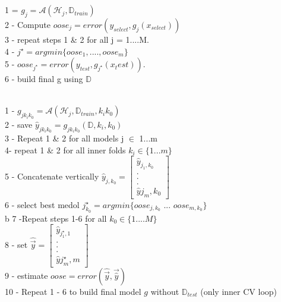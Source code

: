 \documentclass[12pt]{article}
\begin{document}
\begin{enumerate}
\\
\\
1 = $g_j = \mathcal{A} (\mathcal{H}_j, \mathbb{D}_{train})$\\ 2 - Compute $oose_j = error (y_{select}, g_j(x_{select}))$\\ 3 - repeat steps 1 \& 2 for all j = 1....M. \\ 4 - $j^\star = argmin \{oose_1,....,oose_m\}$\\ 5 - $oose_{j^\star} = error(y_{test}, g_{j^\star}(x_test))$.\\ 6 - build final g using $\mathbb{D}$

\\
1 - $g_{jk_ik_0} = \mathcal{A} (\mathcal{H}_j, \mathbb{D}_{train}, k_ik_0)$\\ 2 - save $\hat{y}_{jk_ik_0} = g_{jk_ik_0} (\mathbb{D},k_i,k_0)$ \\ 3 - Repeat 1 \& 2 for all models j $\in$ {1...m} \\4- repeat 1 \& 2 for all inner folds $k_i \in \{1...m\}$\\ 5 - Concatenate vertically $\hat{y}_{j,k_0} = \begin{bmatrix}
\hat{y}_{j_1,k_0} \\ . \\ . \\. \\ \hat{y}{j_m,k_0}
\end{bmatrix} 
$ \\6 - select best medol $j_{k_0}^\star = argmin \{oose_{j,k_0}$ ... $oose_{m,k_0}\}$ \\b 7 -Repeat steps 1-6 for all $k_0 \in \{1....M \}$\\8 -  set $\hat{\vec{y}} = \begin{bmatrix}
\hat{y}_{j_1^\star,1} \\ . \\ . \\. \\ \hat{y}{j_m^\star,m}
\end{bmatrix} $ \\ 9 - estimate $oose = error (\hat{\vec{y}},\vec{\hat{y}})$ \\ 10 - Repeat 1 - 6 to build final model $g$ without $\mathbb{D}_{test}$ (only inner CV loop)\\


\end{enumerate}
\end{document}

